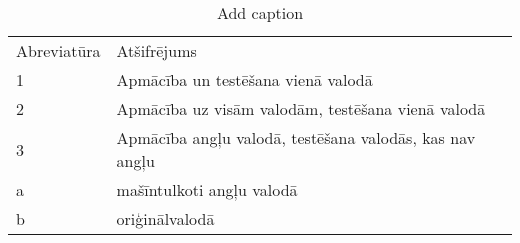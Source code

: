 \begin{table}[htbp]
  \centering
  \caption{Add caption}
    \begin{tabular}{ll}
    Abreviatūra & Atšifrējums \\
    1 & Apmācība un testēšana vienā valodā \\
    2 & Apmācība uz visām valodām, testēšana vienā valodā \\
    3 & Apmācība angļu valodā, testēšana valodās, kas nav angļu \\
    a & mašīntulkoti angļu valodā \\
    b & oriģinālvalodā \\
    \end{tabular}%
  \label{tab:addlabel}%
\end{table}%
